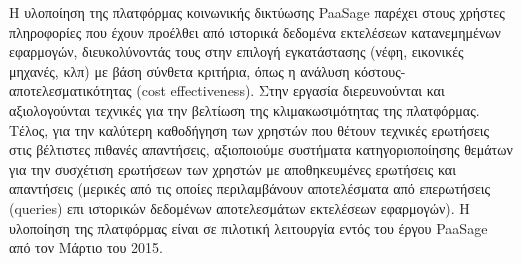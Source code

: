 \begin{titlepage}
Η υλοποίηση της πλατφόρμας κοινωνικής δικτύωσης PaaSage παρέχει στους χρήστες πληροφορίες που έχουν προέλθει από ιστορικά δεδομένα εκτελέσεων κατανεμημένων εφαρμογών, διευκολύνοντάς τους στην επιλογή εγκατάστασης (νέφη, εικονικές μηχανές, κλπ) με βάση σύνθετα κριτήρια, όπως η ανάλυση κόστους-αποτελεσματικότητας (cost effectiveness).  Στην εργασία διερευνούνται και αξιολογούνται τεχνικές για την βελτίωση της κλιμακωσιμότητας της πλατφόρμας. Τέλος, για την καλύτερη καθοδήγηση των χρηστών που θέτουν τεχνικές ερωτήσεις στις βέλτιστες πιθανές απαντήσεις, αξιοποιούμε συστήματα κατηγοριοποίησης θεμάτων για την συσχέτιση ερωτήσεων των χρηστών με αποθηκευμένες ερωτήσεις και απαντήσεις (μερικές από τις οποίες περιλαμβάνουν αποτελέσματα από επερωτήσεις (queries) επι ιστορικών δεδομένων αποτελεσμάτων εκτελέσεων εφαρμογών). Η υλοποίηση της πλατφόρμας είναι σε πιλοτική λειτουργία εντός του έργου PaaSage από τον Μάρτιο του 2015.



\vfill

\end{titlepage}

